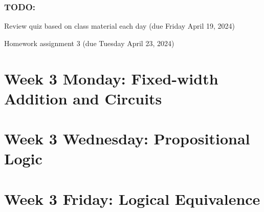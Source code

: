 \subsubsection*{TODO:}
\begin{list}
   {\itemsep2pt}
   \item Review quiz based on class material each day (due Friday April 19, 2024)
   \item Homework assignment 3 (due Tuesday April 23, 2024)
\end{list}

\newpage
\section*{Week 3 Monday: Fixed-width Addition and Circuits}


\vfill
\vfill



\vfill

\vfill
\newpage
\section*{Week 3 Wednesday: Propositional Logic}


\newpage


\vfill

\vfill
\newpage
\section*{Week 3 Friday: Logical Equivalence}


\newpage


\vfill

\vfill

\vfill
\newpage

